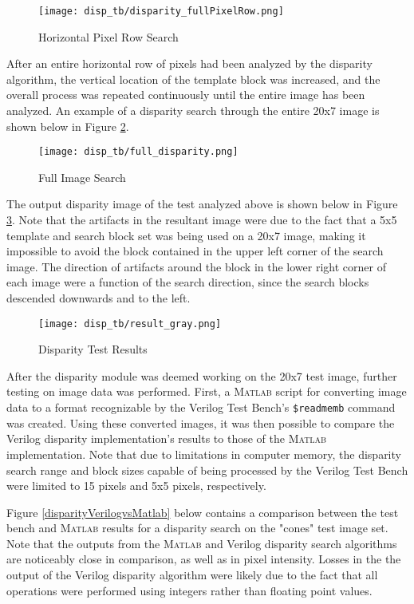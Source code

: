 \par
\begin{figure}[H]
	\centerline{\texttt{[image: disp\_tb/disparity\_fullPixelRow.png]}}
	\caption{Horizontal Pixel Row Search}
	\label{disparityHorizSearch}
\end{figure}
\par
After an entire horizontal row of pixels had been analyzed by the disparity algorithm, the vertical location of the template block was increased, and the overall process was repeated continuously until the entire image has been analyzed. An example of a disparity search through the entire 20x7 image is shown below in Figure \ref{disparityFullSearch}.
\par
\begin{figure}[H]
	\centerline{\texttt{[image: disp\_tb/full\_disparity.png]}}
	\caption{Full Image Search}
	\label{disparityFullSearch}
\end{figure}
\par
The output disparity image of the test analyzed above is shown below in Figure \ref{disparityTestResults}. Note that the artifacts in the resultant image were due to the fact that a 5x5 template and search block set was being used on a 20x7 image, making it impossible to avoid the block contained in the upper left corner of the search image. The direction of artifacts around the block in the lower right corner of each image were a function of the search direction, since the search blocks descended downwards and to the left.
\par
\begin{figure}[H]
	\centerline{\texttt{[image: disp\_tb/result\_gray.png]}}
	\caption{Disparity Test Results}
	\label{disparityTestResults}
\end{figure}
\par
After the disparity module was deemed working on the 20x7 test image, further testing on image data was performed. First, a \textsc{Matlab} script for converting image data to a format recognizable by the Verilog Test Bench's \texttt{\$readmemb} command was created. Using these converted images, it was then possible to compare the Verilog disparity implementation's results to those of the \textsc{Matlab} implementation. Note that due to limitations in computer memory, the disparity search range and block sizes capable of being processed by the Verilog Test Bench were limited to 15 pixels and 5x5 pixels, respectively. 
\par
Figure \ref{disparityVerilogvsMatlab} below contains a comparison between the test bench and \textsc{Matlab} results for a disparity search on the "cones" test image set. Note that the outputs from the \textsc{Matlab} and Verilog disparity search algorithms are noticeably close in comparison, as well as in pixel intensity. Losses in the the output of the Verilog disparity algorithm were likely due to the fact that all operations were performed using integers rather than floating point values.
